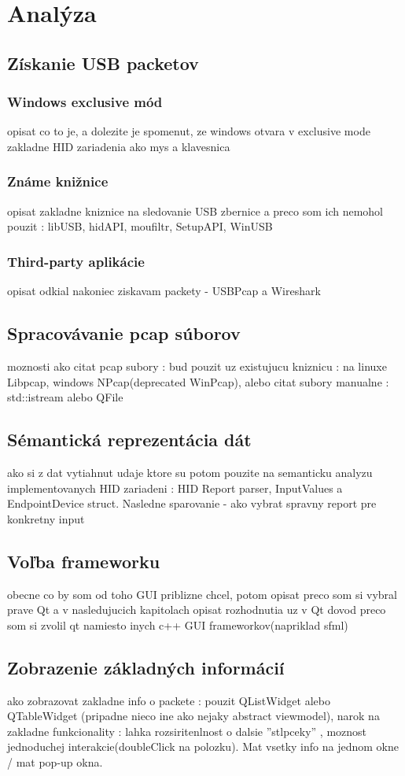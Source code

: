\chapter{Analýza}
\section{Získanie USB packetov}
\subsection{Windows exclusive mód}
opisat co to je, a dolezite je spomenut, ze windows otvara v exclusive mode zakladne HID zariadenia ako mys a klavesnica
\subsection{Známe knižnice}
opisat zakladne kniznice na sledovanie USB zbernice a preco som ich nemohol pouzit : libUSB, hidAPI, moufiltr, SetupAPI, WinUSB
\subsection{Third-party aplikácie}
opisat odkial nakoniec ziskavam packety - USBPcap a Wireshark
\section{Spracovávanie pcap súborov}
moznosti ako citat pcap subory : bud pouzit uz existujucu kniznicu : na linuxe Libpcap, windows NPcap(deprecated WinPcap), alebo citat subory manualne : std::istream alebo QFile
\section{Sémantická reprezentácia dát}
ako si z dat vytiahnut udaje ktore su potom pouzite na semanticku analyzu implementovanych HID zariadeni : HID Report parser, InputValues a EndpointDevice struct.
Nasledne sparovanie - ako vybrat spravny report pre konkretny input
\section{Voľba frameworku}
obecne co by som od toho GUI priblizne chcel, potom opisat preco som si vybral prave Qt a v nasledujucich kapitolach opisat rozhodnutia uz v Qt
dovod preco som si zvolil qt namiesto inych c++ GUI frameworkov(napriklad sfml)
\section{Zobrazenie základných informácií}
ako zobrazovat zakladne info o packete : pouzit QListWidget alebo QTableWidget (pripadne nieco ine ako nejaky abstract viewmodel), narok na zakladne funkcionality : lahka rozsiritenlnost o dalsie ''stlpceky'' , moznost jednoduchej interakcie(doubleClick na polozku). Mat vsetky info na jednom okne / mat pop-up okna.

